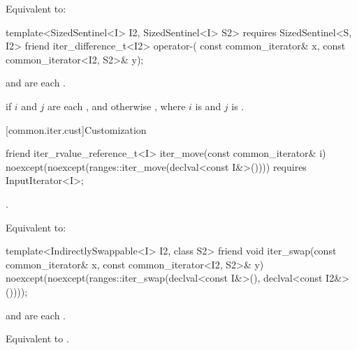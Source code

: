\begin{itemdescr}
\pnum
\effects Equivalent to: 
\end{itemdescr}

%
\begin{itemdecl}
template<SizedSentinel<I> I2, SizedSentinel<I> S2>
  requires SizedSentinel<S, I2>
friend iter_difference_t<I2> operator-(
  const common_iterator& x, const common_iterator<I2, S2>& y);
\end{itemdecl}

\begin{itemdescr}
\pnum
\expects
{} and 
are each .

\pnum
\returns
{} if $i$ and $j$ are each , and otherwise
, where
$i$ is  and $j$ is .
\end{itemdescr}

[common.iter.cust]{Customization}

%
\begin{itemdecl}
friend iter_rvalue_reference_t<I> iter_move(const common_iterator& i)
  noexcept(noexcept(ranges::iter_move(declval<const I&>())))
    requires InputIterator<I>;
\end{itemdecl}

\begin{itemdescr}
\pnum
\expects {}.

\pnum
\effects Equivalent to: 
\end{itemdescr}

%
\begin{itemdecl}
template<IndirectlySwappable<I> I2, class S2>
  friend void iter_swap(const common_iterator& x, const common_iterator<I2, S2>& y)
    noexcept(noexcept(ranges::iter_swap(declval<const I&>(), declval<const I2&>())));
\end{itemdecl}

\begin{itemdescr}
\pnum
\expects
{} and 
are each .

\pnum
\effects Equivalent to .
\end{itemdescr}

